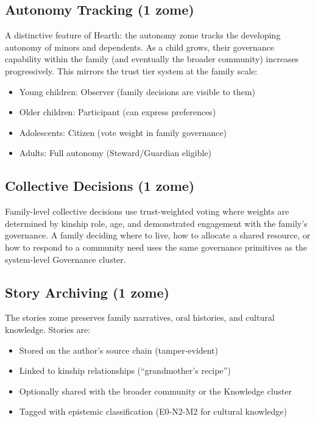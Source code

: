 \documentclass[12pt]{book}
\begin{document}
\subsection{Autonomy Tracking (1 zome)}

A distinctive feature of Hearth: the autonomy zome tracks the developing
autonomy of minors and dependents. As a child grows, their governance
capability within the family (and eventually the broader community) increases
progressively. This mirrors the trust tier system at the family scale:

\begin{itemize}
  \item Young children: Observer (family decisions are visible to them)
  \item Older children: Participant (can express preferences)
  \item Adolescents: Citizen (vote weight in family governance)
  \item Adults: Full autonomy (Steward/Guardian eligible)
\end{itemize}

\subsection{Collective Decisions (1 zome)}

Family-level collective decisions use trust-weighted voting where weights
are determined by kinship role, age, and demonstrated engagement with the
family's governance. A family deciding where to live, how to allocate a
shared resource, or how to respond to a community need uses the same
governance primitives as the system-level Governance cluster.

\subsection{Story Archiving (1 zome)}

The stories zome preserves family narratives, oral histories, and cultural
knowledge. Stories are:

\begin{itemize}
  \item Stored on the author's source chain (tamper-evident)
  \item Linked to kinship relationships (``grandmother's recipe'')
  \item Optionally shared with the broader community or the Knowledge cluster
  \item Tagged with epistemic classification (E0-N2-M2 for cultural knowledge)
\end{itemize}
\end{document}

